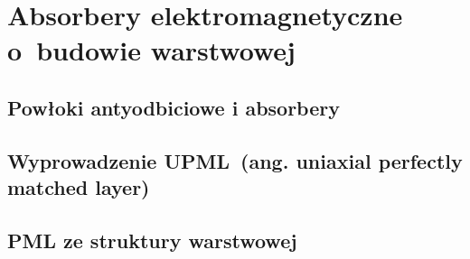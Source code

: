 \chapter{Absorbery elektromagnetyczne o~budowie warstwowej}
\label{roz:pml}

\section{Powłoki antyodbiciowe i absorbery}

\section{Wyprowadzenie UPML~(ang. uniaxial perfectly matched layer)}

\section{PML ze struktury warstwowej~\cite{ania2015}}

